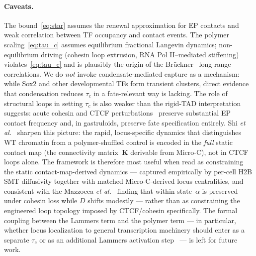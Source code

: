 \documentclass[11pt]{article}
\begin{document}
\paragraph{Caveats.} The bound~\eqref{eq:star} assumes the renewal
approximation for EP contacts and weak correlation between TF occupancy and
contact events. The polymer scaling~\eqref{eq:tau_c} assumes equilibrium
fractional Langevin dynamics; non-equilibrium driving (cohesin loop
extrusion, RNA Pol II--mediated stiffening) violates~\eqref{eq:tau_c} and
is plausibly the origin of the Br\"uckner~\cite{Bruckner2023} long-range
correlations. We do \emph{not} invoke condensate-mediated capture as a
mechanism: while Sox2 and other developmental TFs form transient
clusters, direct evidence that condensation reduces $\tau_c$ in a
fate-relevant way is lacking. The role of structural loops in setting
$\tau_c$ is also weaker than the rigid-TAD interpretation suggests: acute
cohesin and CTCF
perturbations~\cite{Rao2017,Schwarzer2017,Hsieh2022,Saiz2026} preserve
substantial EP contact frequency and, in gastruloids, preserve fate
specification entirely. Shi \textit{et al.}~\cite{Shi2025} sharpen this
picture: the rapid, locus-specific dynamics that distinguishes WT
chromatin from a polymer-shuffled control is encoded in the
\emph{full} static contact map (the connectivity matrix~$\mathbf{K}$
derivable from Micro-C), not in CTCF loops alone. The framework is
therefore most useful when read as constraining the static
contact-map-derived dynamics --- captured empirically by per-cell H2B SMT
diffusivity together with matched Micro-C-derived locus centralities,
and consistent with the Mazzocca \textit{et al.}~\cite{Mazzocca2024}
finding that within-state~$\alpha$ is preserved under cohesin loss while
$D$ shifts modestly --- rather than as constraining the engineered loop
topology imposed by CTCF/cohesin specifically. The formal coupling between the
Lammers term and the polymer term --- in particular, whether locus
localization to general transcription machinery should enter as a separate
$\tau_c$ or as an additional Lammers activation step~\cite{Lammers2023} ---
is left for future work.
\end{document}
